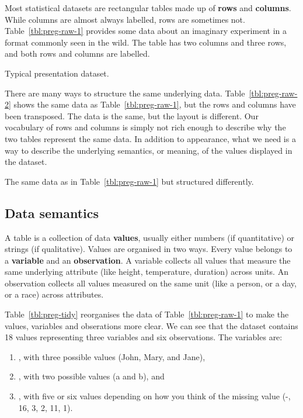 \documentclass[article]{jss}
\begin{document}
Most statistical datasets are rectangular tables made up of \textbf{rows} and \textbf{columns}. While columns are almost always labelled, rows are sometimes not. Table~\ref{tbl:preg-raw-1} provides some data about an imaginary experiment in a format commonly seen in the wild. The table has two columns and three rows, and both rows and columns are labelled.

\begin{table}[htbp]
  \centering
  
  \caption{Typical presentation dataset.}
  \label{tbl:preg-raw-1}
\end{table}

There are many ways to structure the same underlying data. Table~\ref{tbl:preg-raw-2} shows the same data as Table~\ref{tbl:preg-raw-1}, but the rows and columns have been transposed. The data is the same, but the layout is different. Our vocabulary of rows and columns is simply not rich enough to describe why the two tables represent the same data. In addition to appearance, what we need is a way to describe the underlying semantics, or meaning, of the values displayed in the dataset.

\begin{table}[htbp]
  \centering
  
  \caption{The same data as in Table~\ref{tbl:preg-raw-1} but structured differently.}
  \label{tbl:preg-raw-2}
\end{table}

\subsection{Data semantics}

A table is a collection of data \textbf{values}, usually either numbers (if quantitative) or strings (if qualitative). Values are organised in two ways. Every value belongs to a \textbf{variable} and an \textbf{observation}. A variable collects all values that measure the same underlying attribute (like height, temperature, duration) across units. An observation collects all values measured on the same unit (like a person, or a day, or a race) across attributes. 

Table~\ref{tbl:preg-tidy} reorganises the data of Table~\ref{tbl:preg-raw-1} to make the values, variables and obserations more clear. We can see that the dataset contains 18 values representing three variables and six observations. The variables are:

\begin{enumerate}

\item {}, with three possible values (John, Mary, and Jane),

\item {}, with two possible values (a and b), and 

\item {}, with five or six values depending on how you think of the missing value (-, 16, 3, 2, 11, 1).

\end{enumerate}
\end{document}
